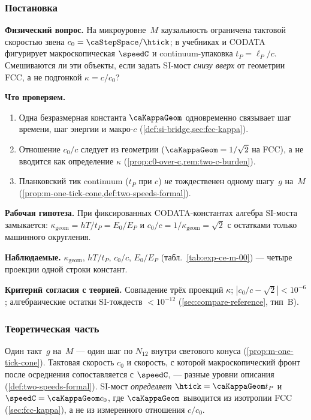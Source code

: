 \label{exp:cem00}

\subsubsection*{Постановка}
\textbf{Физический вопрос.}
На микроуровне~$M$ каузальность ограничена тактовой скоростью звена $c_0=\caStepSpace/\htick$;
в учебниках и CODATA фигурирует макроскопическая $\speedC$ и continuum-упаковка $t_P=\ell_P/c$.
Смешиваются ли эти объекты, если задать SI-мост \emph{снизу вверх} от геометрии FCC, а не подгонкой $\kappa=c/c_0$?

\textbf{Что проверяем.}
\begin{enumerate}[label=\textbf{(\alph*)},leftmargin=*,itemsep=0.25em]
\item Одна безразмерная константа $\caKappaGeom$ одновременно связывает шаг времени, шаг энергии и макро-$c$ (\cref{def:si-bridge,sec:fcc-kappa}).
\item Отношение $c_0/c$ следует из геометрии ($\caKappaGeom=1/\sqrt{2}$ на FCC), а не вводится как определение $\kappa$ (\cref{prop:c0-over-c,rem:two-c-burden}).
\item Планковский тик continuum ($t_P$ при $c$) \emph{не} тождественен одному шагу~$g$ на~$M$ (\cref{prop:m-one-tick-cone,def:two-speeds-formal}).
\end{enumerate}

\textbf{Рабочая гипотеза.}
При фиксированных CODATA-константах алгебра SI-моста замыкается: $\kappa_{\mathrm{geom}}=hT/t_P=E_0/E_P$ и $c_0/c=1/\kappa_{\mathrm{geom}}=\sqrt{2}$ с остатками только машинного округления.

\textbf{Наблюдаемые.}
$\kappa_{\mathrm{geom}}$, $hT/t_P$, $c_0/c$, $E_0/E_P$ (табл.~\ref{tab:exp-ce-m-00}) --- четыре проекции одной строки констант.

\textbf{Критерий согласия с теорией.}
Совпадение трёх проекций $\kappa$; $|c_0/c-\sqrt{2}|<10^{-6}$; алгебраические остатки SI-тождеств $<10^{-12}$ (\cref{sec:compare-reference}, тип~B).

\subsubsection*{Теоретическая часть}
Один такт~$g$ на~$M$ --- один шаг по $N_{12}$ внутри светового конуса (\cref{prop:m-one-tick-cone}).
Тактовая скорость $c_0$ и скорость, с которой макроскопический фронт после осреднения сопоставляется с $\speedC$, --- разные уровни описания (\cref{def:two-speeds-formal}).
SI-мост \emph{определяет} $\htick=\caKappaGeom t_P$ и $\speedC=\caKappaGeom c_0$, где $\caKappaGeom$ выводится из изотропии FCC (\cref{sec:fcc-kappa}), а не из измеренного отношения $c/c_0$.

